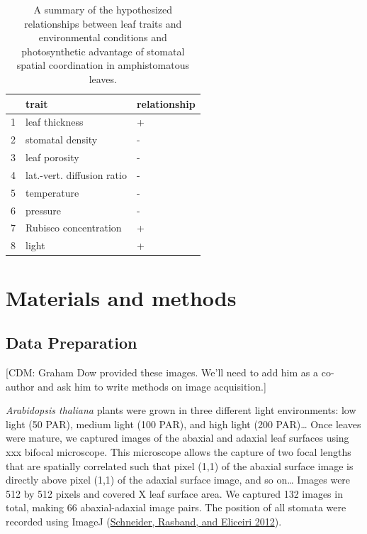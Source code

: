 \documentclass[12pt,halfline,a4paper,]{ouparticle}
\begin{document}
\begin{table}[ht]
\centering
\begin{tabular}{rll}
  \hline
 & trait & relationship \\ 
  \hline
1 & leaf thickness & + \\ 
  2 & stomatal density & - \\ 
  3 & leaf porosity & - \\ 
  4 & lat.-vert. diffusion ratio & - \\ 
  5 & temperature & - \\ 
  6 & pressure & - \\ 
  7 & Rubisco concentration & + \\ 
  8 & light & + \\ 
   \hline
\end{tabular}
\caption{A summary of the hypothesized relationships between leaf traits and environmental conditions and photosynthetic advantage of stomatal spatial coordination in amphistomatous leaves.} 
\label{tab:hypotheses}
\end{table}

\hypertarget{materials-and-methods}{%
\section{Materials and methods}\label{materials-and-methods}}

\hypertarget{data-preparation}{%
\subsection{Data Preparation}\label{data-preparation}}

{[}CDM: Graham Dow provided these images. We'll need to add him as a
co-author and ask him to write methods on image acquisition.{]}

\emph{Arabidopsis thaliana} plants were grown in three different light
environments: low light (50 PAR), medium light (100 PAR), and high light
(200 PAR)\ldots{} Once leaves were mature, we captured images of the
abaxial and adaxial leaf surfaces using xxx bifocal microscope. This
microscope allows the capture of two focal lengths that are spatially
correlated such that pixel (1,1) of the abaxial surface image is
directly above pixel (1,1) of the adaxial surface image, and so
on\ldots{} Images were 512 by 512 pixels and covered X leaf surface
area. We captured 132 images in total, making 66 abaxial-adaxial image
pairs. The position of all stomata were recorded using ImageJ
(\protect\hyperlink{ref-schneider_nih_2012}{Schneider, Rasband, and
Eliceiri 2012}).
\end{document}
